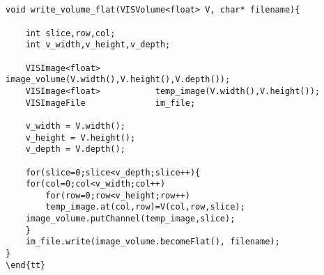 \begin{appendix}
\begin{verbatim}
  
  
void write_volume_flat(VISVolume<float> V, char* filename){

    int slice,row,col;
    int v_width,v_height,v_depth;

    VISImage<float>           image_volume(V.width(),V.height(),V.depth());
    VISImage<float>           temp_image(V.width(),V.height());
    VISImageFile              im_file;

    v_width = V.width();
    v_height = V.height();
    v_depth = V.depth();

    for(slice=0;slice<v_depth;slice++){
	for(col=0;col<v_width;col++)
	    for(row=0;row<v_height;row++)
		temp_image.at(col,row)=V(col,row,slice);
	image_volume.putChannel(temp_image,slice);
    }
    im_file.write(image_volume.becomeFlat(), filename);
}
\end{tt}
\end{verbatim}

\end{appendix}
\clearpage












